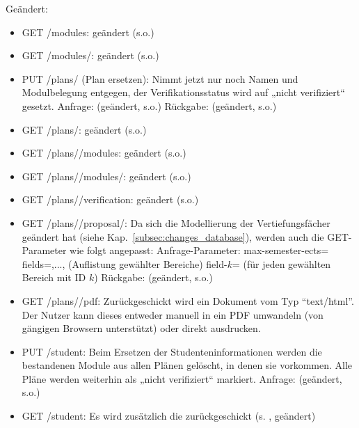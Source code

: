 Geändert:
\begin{itemize}
	\item GET /modules: \quad {} geändert (s.o.)
	\item GET /modules/: \quad {} geändert (s.o.)
	\item PUT /plans/ \quad (Plan ersetzen): \newline
		  Nimmt jetzt nur noch Namen und Modulbelegung entgegen, der Verifikationsstatus wird auf „nicht verifiziert“ gesetzt. \newline
		  Anfrage:  (geändert, s.o.) \newline
		  Rückgabe:  (geändert, s.o.)
	\item GET /plans/: \quad {} geändert (s.o.)
	\item GET /plans//modules: \quad {} geändert (s.o.)
	\item GET /plans//modules/: \quad {} geändert (s.o.)
	\item GET /plans//verification: \quad {} geändert (s.o.)
	\item GET /plans//proposal/: \newline
		  Da sich die Modellierung der Vertiefungsfächer geändert hat (siehe Kap.~\ref{subsec:changes_database}), werden auch die GET-Parameter wie folgt angepasst: \newline
		  Anfrage-Parameter: 
		  \subitem max-semester-ects= 
		  \subitem fields=,...,  
		  \subsubitem (Auflistung gewählter Bereiche) 
		  \subitem field-$k$= 
		  \subsubitem (für jeden gewählten Bereich mit ID $k$) \newline
		  Rückgabe:  (geändert, s.o.)
	\item GET /plans//pdf: \newline
		  Zurückgeschickt wird ein Dokument vom Typ ``text/html''. Der Nutzer kann dieses entweder manuell in ein PDF umwandeln (von gängigen Browsern unterstützt) oder direkt ausdrucken.
	\item PUT /student: \newline
		  Beim Ersetzen der Studenteninformationen werden die bestandenen Module aus allen Plänen gelöscht, in denen sie vorkommen. Alle Pläne werden weiterhin als „nicht verifiziert“ markiert. \newline
		  Anfrage:  (geändert, s.o.) 
	\item GET /student: \newline
		  Es wird zusätzlich die  zurückgeschickt (s. , geändert)
\end{itemize}


